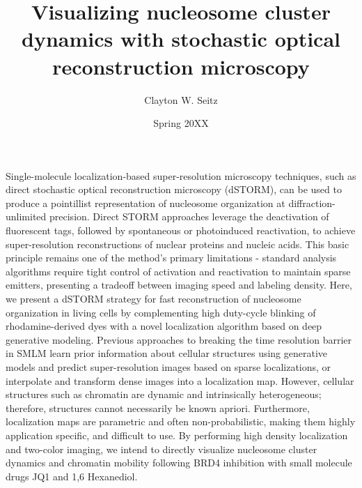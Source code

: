 \documentclass{ucetd}
\title{Visualizing nucleosome cluster dynamics with stochastic optical reconstruction microscopy}
\author{Clayton W. Seitz}
\date{Spring 20XX}
\begin{document}



\tableofcontents


\abstract

Single-molecule localization-based super-resolution microscopy techniques, such as direct stochastic optical reconstruction microscopy (dSTORM), can be used to produce a pointillist representation of nucleosome organization at diffraction-unlimited precision. Direct STORM approaches leverage the deactivation of fluorescent tags, followed by spontaneous or photoinduced reactivation, to achieve super-resolution reconstructions of nuclear proteins and nucleic acids. This basic principle remains one of the method's primary limitations - standard analysis algorithms require tight control of activation and reactivation to maintain sparse emitters, presenting a tradeoff between imaging speed and labeling density. Here, we present a dSTORM strategy for fast reconstruction of nucleosome organization in living cells by complementing high duty-cycle blinking of rhodamine-derived dyes with a novel localization algorithm based on deep generative modeling. Previous approaches to breaking the time resolution barrier in SMLM learn prior information about cellular structures using generative models and predict super-resolution images based on sparse localizations, or interpolate and transform dense images into a localization map. However, cellular structures such as chromatin are dynamic and intrinsically heterogeneous; therefore, structures cannot necessarily be known apriori. Furthermore, localization maps are parametric and often non-probabilistic, making them highly application specific, and difficult to use. By performing high density localization and two-color imaging, we intend to directly visualize nucleosome cluster dynamics and chromatin mobility following BRD4 inhibition with small molecule drugs JQ1 and 1,6 Hexanediol.


\clearpage
\end{document}
